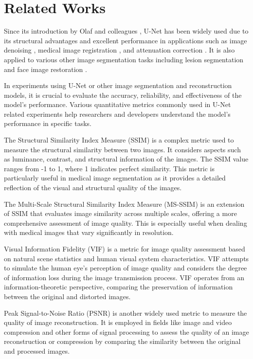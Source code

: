 \documentclass[twocolumn]{article}
\begin{document}
\section{Related Works}
Since its introduction by Olaf and colleagues \cite{navab_u-net_2015}, U-Net has been widely used due to its structural advantages and excellent performance in applications such as image denoising \cite{armanious_medgan_2020}, medical image registration \cite{singh_automated_2023}, and attenuation correction \cite{liu_deep_2018}. It is also applied to various other image segmentation tasks including lesion segmentation \cite{du_medical_2020} and face image restoration \cite{zeng_swin-casunet_2022}.

In experiments using U-Net or other image segmentation and reconstruction models, it is crucial to evaluate the accuracy, reliability, and effectiveness of the model's performance. Various quantitative metrics commonly used in U-Net related experiments help researchers and developers understand the model's performance in specific tasks.

The Structural Similarity Index Measure (SSIM) is a complex metric used to measure the structural similarity between two images. It considers aspects such as luminance, contrast, and structural information of the images. The SSIM value ranges from -1 to 1, where 1 indicates perfect similarity. This metric is particularly useful in medical image segmentation as it provides a detailed reflection of the visual and structural quality of the images.

The Multi-Scale Structural Similarity Index Measure (MS-SSIM) is an extension of SSIM that evaluates image similarity across multiple scales, offering a more comprehensive assessment of image quality. This is especially useful when dealing with medical images that vary significantly in resolution.

Visual Information Fidelity (VIF) is a metric for image quality assessment based on natural scene statistics and human visual system characteristics. VIF attempts to simulate the human eye's perception of image quality and considers the degree of information loss during the image transmission process. VIF operates from an information-theoretic perspective, comparing the preservation of information between the original and distorted images.

Peak Signal-to-Noise Ratio (PSNR) is another widely used metric to measure the quality of image reconstruction. It is employed in fields like image and video compression and other forms of signal processing to assess the quality of an image reconstruction or compression by comparing the similarity between the original and processed images.
\end{document}
